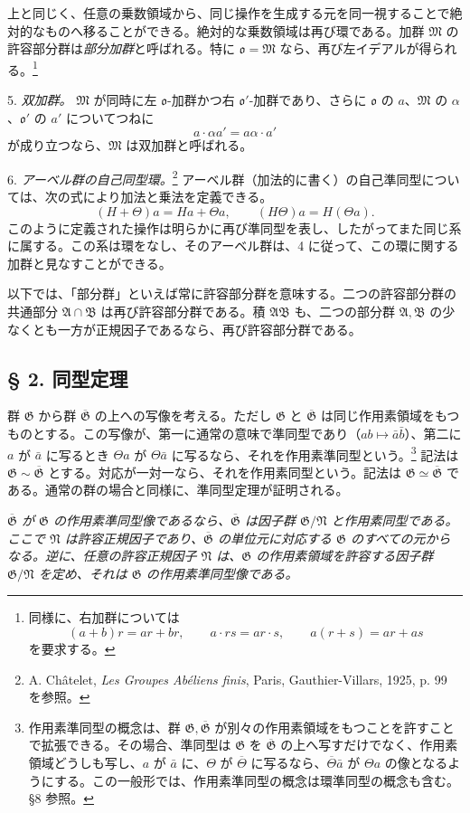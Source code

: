 \documentclass[11pt]{article}
\providecommand{\mG}{\mathfrak{G}}
\providecommand{\mA}{\mathfrak{A}}
\providecommand{\mB}{\mathfrak{B}}
\providecommand{\mM}{\mathfrak{M}}
\providecommand{\mN}{\mathfrak{N}}
\providecommand{\mo}{\mathfrak{o}}
\begin{document}
上と同じく、任意の乗数領域から、同じ操作を生成する元を同一視することで絶対的なものへ移ることができる。絶対的な乗数領域は再び環である。加群 $\mM$ の許容部分群は\emph{部分加群}と呼ばれる。特に $\mo=\mM$ なら、再び左イデアルが得られる。\footnote{同様に、右加群については
\[
(a+b)r=ar+br,\qquad a\cdot rs=ar\cdot s,\qquad a(r+s)=ar+as
\]
を要求する。}

5. \emph{双加群。} $\mM$ が同時に左 $\mo$-加群かつ右 $\mo'$-加群であり、さらに $\mo$ の $a$、$\mM$ の $\alpha$、$\mo'$ の $a'$ についてつねに
\[
        a\cdot\alpha a'=a\alpha\cdot a'
\]
が成り立つなら、$\mM$ は双加群と呼ばれる。

6. \emph{アーベル群の自己同型環。}\footnote{A. Châtelet, \emph{Les Groupes Abéliens finis}, Paris, Gauthier-Villars, 1925, p. 99 を参照。} アーベル群（加法的に書く）の自己準同型については、次の式により加法と乗法を定義できる。
\[
        (H+\Theta)a=Ha+\Theta a,\qquad (H\Theta)a=H(\Theta a).
\]
このように定義された操作は明らかに再び準同型を表し、したがってまた同じ系に属する。この系は環をなし、そのアーベル群は、4 に従って、この環に関する加群と見なすことができる。

以下では、「部分群」といえば常に許容部分群を意味する。二つの許容部分群の共通部分 $\mA\cap\mB$ は再び許容部分群である。積 $\mA\mB$ も、二つの部分群 $\mA,\mB$ の少なくとも一方が正規因子であるなら、再び許容部分群である。

\subsection*{§ 2. 同型定理}

群 $\mG$ から群 $\overline{\mG}$ の上への写像を考える。ただし $\mG$ と $\overline{\mG}$ は同じ作用素領域をもつものとする。この写像が、第一に通常の意味で準同型であり（$ab\mapsto \bar a\bar b$）、第二に $a$ が $\bar a$ に写るとき $\Theta a$ が $\Theta\bar a$ に写るなら、それを作用素準同型という。\footnote{作用素準同型の概念は、群 $\mG,\overline{\mG}$ が別々の作用素領域をもつことを許すことで拡張できる。その場合、準同型は $\mG$ を $\overline{\mG}$ の上へ写すだけでなく、作用素領域どうしも写し、$a$ が $\bar a$ に、$\Theta$ が $\overline\Theta$ に写るなら、$\overline\Theta\bar a$ が $\Theta a$ の像となるようにする。この一般形では、作用素準同型の概念は環準同型の概念も含む。§8 参照。} 記法は $\mG\sim\overline{\mG}$ とする。対応が一対一なら、それを作用素同型という。記法は $\mG\simeq\overline{\mG}$ である。通常の群の場合と同様に、準同型定理が証明される。

\emph{$\overline{\mG}$ が $\mG$ の作用素準同型像であるなら、$\overline{\mG}$ は因子群 $\mG/\mN$ と作用素同型である。ここで $\mN$ は許容正規因子であり、$\overline{\mG}$ の単位元に対応する $\mG$ のすべての元からなる。逆に、任意の許容正規因子 $\mN$ は、$\mG$ の作用素領域を許容する因子群 $\mG/\mN$ を定め、それは $\mG$ の作用素準同型像である。}
\end{document}

